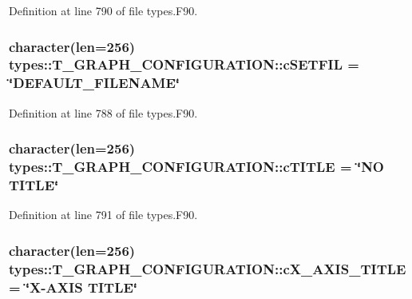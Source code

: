 Definition at line 790 of file types.F90.

\hypertarget{typetypes_1_1_t___g_r_a_p_h___c_o_n_f_i_g_u_r_a_t_i_o_n_aff23fac81d9ac52eabdbbe12187aac2b}{
\subsubsection[{cSETFIL}]{\setlength{\rightskip}{0pt plus 5cm}character(len=256) {\bf types::T\_\-GRAPH\_\-CONFIGURATION::cSETFIL} = \char`\"{}DEFAULT\_\-FILENAME\char`\"{}}}
\label{typetypes_1_1_t___g_r_a_p_h___c_o_n_f_i_g_u_r_a_t_i_o_n_aff23fac81d9ac52eabdbbe12187aac2b}


Definition at line 788 of file types.F90.

\hypertarget{typetypes_1_1_t___g_r_a_p_h___c_o_n_f_i_g_u_r_a_t_i_o_n_ac5c7453e946784df5e4e760c55ef0786}{
\subsubsection[{cTITLE}]{\setlength{\rightskip}{0pt plus 5cm}character(len=256) {\bf types::T\_\-GRAPH\_\-CONFIGURATION::cTITLE} = \char`\"{}NO TITLE\char`\"{}}}
\label{typetypes_1_1_t___g_r_a_p_h___c_o_n_f_i_g_u_r_a_t_i_o_n_ac5c7453e946784df5e4e760c55ef0786}


Definition at line 791 of file types.F90.

\hypertarget{typetypes_1_1_t___g_r_a_p_h___c_o_n_f_i_g_u_r_a_t_i_o_n_a71ef908000e36b5578a0447c4d56db09}{
\subsubsection[{cX\_\-AXIS\_\-TITLE}]{\setlength{\rightskip}{0pt plus 5cm}character(len=256) {\bf types::T\_\-GRAPH\_\-CONFIGURATION::cX\_\-AXIS\_\-TITLE} = \char`\"{}X-\/AXIS TITLE\char`\"{}}}
\label{typetypes_1_1_t___g_r_a_p_h___c_o_n_f_i_g_u_r_a_t_i_o_n_a71ef908000e36b5578a0447c4d56db09}


